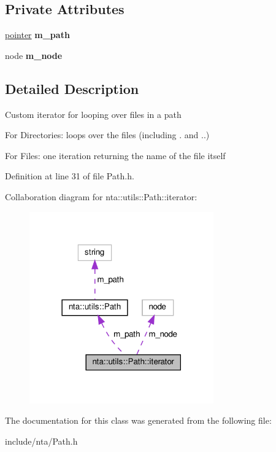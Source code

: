 \subsection*{Private Attributes}
\begin{DoxyCompactItemize}
\item 
\mbox{\label{classnta_1_1utils_1_1Path_1_1iterator_afabcec214e399d8cd3c9b9b08a872799}} 
\hyperlink{classnta_1_1utils_1_1Path}{pointer} {\bfseries m\+\_\+path}
\item 
\mbox{\label{classnta_1_1utils_1_1Path_1_1iterator_a9b7810eb2d542b99e5b7c07ed6c84723}} 
node {\bfseries m\+\_\+node}
\end{DoxyCompactItemize}


\subsection{Detailed Description}
Custom iterator for looping over files in a path

For Directories\+: loops over the files (including . and ..)

For Files\+: one iteration returning the name of the file itself 

Definition at line 31 of file Path.\+h.



Collaboration diagram for nta\+:\+:utils\+:\+:Path\+:\+:iterator\+:
\nopagebreak
\begin{figure}[H]
\begin{center}
\leavevmode
\includegraphics[width=225pt]{d8/d0b/classnta_1_1utils_1_1Path_1_1iterator__coll__graph}
\end{center}
\end{figure}


The documentation for this class was generated from the following file\+:\begin{DoxyCompactItemize}
\item 
include/nta/Path.\+h\end{DoxyCompactItemize}
